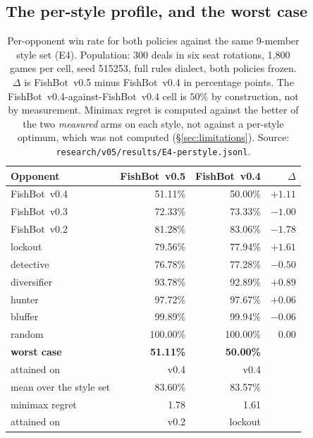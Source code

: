 \documentclass[11pt]{article}
\theoremstyle{definition}
\DeclareRobustCommand{\vfive}{\texorpdfstring{\mbox{FishBot v0.5}}{FishBot v0.5}}
\DeclareRobustCommand{\vfour}{\texorpdfstring{\mbox{FishBot v0.4}}{FishBot v0.4}}
\DeclareRobustCommand{\vthree}{\texorpdfstring{\mbox{FishBot v0.3}}{FishBot v0.3}}
\DeclareRobustCommand{\vtwo}{\texorpdfstring{\mbox{FishBot v0.2}}{FishBot v0.2}}
\providecommand{\numStyleDeals}{300}
\providecommand{\numStyleSeed}{515253}
\providecommand{\numPanelVfiveVfour}{51.11}
\providecommand{\numDeltaVfour}{+1.11}
\providecommand{\numDeltaVthree}{-1.00}
\providecommand{\numDeltaVtwo}{-1.78}
\providecommand{\numDeltaLockout}{+1.61}
\providecommand{\numDeltaDiversifier}{+0.89}
\providecommand{\numDeltaHunter}{+0.06}
\providecommand{\numDeltaBluffer}{-0.06}
\providecommand{\numDeltaRandom}{0.00}
\providecommand{\numVfiveMean}{83.60}
\providecommand{\numVfourMean}{83.57}
\providecommand{\numVfiveWorst}{51.11}
\providecommand{\numVfourWorst}{50.00}
\providecommand{\numVfiveRegret}{1.78}
\providecommand{\numVfourRegret}{1.61}
\providecommand{\numPanelVfiveBluffer}{99.89}
\providecommand{\numPanelVfiveDetective}{76.78}
\providecommand{\numPanelVfiveDiversifier}{93.78}
\providecommand{\numPanelVfiveHunter}{97.72}
\providecommand{\numPanelVfiveLockout}{79.56}
\providecommand{\numPanelVfiveRandom}{100.00}
\providecommand{\numPanelVfiveVthree}{72.33}
\providecommand{\numPanelVfiveVtwo}{81.28}
\providecommand{\numPanelVfourBluffer}{99.94}
\providecommand{\numPanelVfourDetective}{77.28}
\providecommand{\numPanelVfourDiversifier}{92.89}
\providecommand{\numPanelVfourHunter}{97.67}
\providecommand{\numPanelVfourLockout}{77.94}
\providecommand{\numPanelVfourRandom}{100.00}
\providecommand{\numPanelVfourVfour}{50.00}
\providecommand{\numPanelVfourVthree}{73.33}
\providecommand{\numPanelVfourVtwo}{83.06}
\providecommand{\numStyleGames}{1{,}800}
\providecommand{\numVfiveStyleN}{9}
\providecommand{\numVfiveWorstOpp}{v0.4}
\providecommand{\numVfourWorstOpp}{v0.4}
\providecommand{\numDeltaDetective}{-0.50}
\providecommand{\numVfiveRegretOpp}{v0.2}
\providecommand{\numVfourRegretOpp}{lockout}
\begin{document}
\subsection{The per-style profile, and the worst case}
\label{sec:results-style}

\begin{table}[t]
\centering
\caption{Per-opponent win rate for both policies against the same
\numVfiveStyleN{}-member style set (E4). Population: \numStyleDeals{} deals in six
seat rotations, \numStyleGames{} games per cell, seed \numStyleSeed{}, full rules
dialect, both policies frozen. $\Delta$ is \vfive{} minus \vfour{} in percentage
points. The \vfour{}-against-\vfour{} cell is $50\%$ by construction, not by
measurement. Minimax regret is computed against the better of the two
\emph{measured} arms on each style, not against a per-style optimum, which was
not computed (\S\ref{sec:limitations}). Source:
\texttt{research/v05/results/E4-perstyle.jsonl}.}
\label{tab:perstyle}
\small
\begin{tabular}{lrrr}
\toprule
\textbf{Opponent} & \textbf{\vfive{}} & \textbf{\vfour{}} & \textbf{$\Delta$} \\
\midrule
\vfour{}      & \numPanelVfiveVfour\%       & \numPanelVfourVfour\%       & $\numDeltaVfour$ \\
\vthree{}     & \numPanelVfiveVthree\%      & \numPanelVfourVthree\%      & $\numDeltaVthree$ \\
\vtwo{}       & \numPanelVfiveVtwo\%        & \numPanelVfourVtwo\%        & $\numDeltaVtwo$ \\
lockout       & \numPanelVfiveLockout\%     & \numPanelVfourLockout\%     & $\numDeltaLockout$ \\
detective     & \numPanelVfiveDetective\%   & \numPanelVfourDetective\%   & $\numDeltaDetective$ \\
diversifier   & \numPanelVfiveDiversifier\% & \numPanelVfourDiversifier\% & $\numDeltaDiversifier$ \\
hunter        & \numPanelVfiveHunter\%      & \numPanelVfourHunter\%      & $\numDeltaHunter$ \\
bluffer       & \numPanelVfiveBluffer\%     & \numPanelVfourBluffer\%     & $\numDeltaBluffer$ \\
random        & \numPanelVfiveRandom\%      & \numPanelVfourRandom\%      & $\numDeltaRandom$ \\
\midrule
\textbf{worst case}          & \textbf{\numVfiveWorst\%} & \textbf{\numVfourWorst\%} & \\
\quad attained on            & \numVfiveWorstOpp{}       & \numVfourWorstOpp{}       & \\
mean over the style set      & \numVfiveMean\%           & \numVfourMean\%           & \\
minimax regret               & \numVfiveRegret{}         & \numVfourRegret{}         & \\
\quad attained on            & \numVfiveRegretOpp{}      & \numVfourRegretOpp{}      & \\
\bottomrule
\end{tabular}
\end{table}
\end{document}
